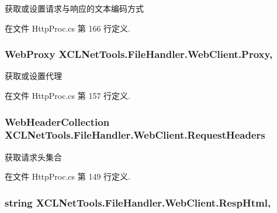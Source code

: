 获取或设置请求与响应的文本编码方式 



在文件 Http\-Proc.\-cs 第 166 行定义.

\hypertarget{class_x_c_l_net_tools_1_1_file_handler_1_1_web_client_ac2f17eefdc2372eb01a6be915d19c0ba}{
\subsubsection[{Proxy}]{\setlength{\rightskip}{0pt plus 5cm}Web\-Proxy X\-C\-L\-Net\-Tools.\-File\-Handler.\-Web\-Client.\-Proxy\hspace{0.3cm}{\ttfamily [get]}, {\ttfamily [set]}}}\label{class_x_c_l_net_tools_1_1_file_handler_1_1_web_client_ac2f17eefdc2372eb01a6be915d19c0ba}


获取或设置代理 



在文件 Http\-Proc.\-cs 第 157 行定义.

\hypertarget{class_x_c_l_net_tools_1_1_file_handler_1_1_web_client_a89d4bf2af70a2a0991904b1b61c8dd1d}{
\subsubsection[{Request\-Headers}]{\setlength{\rightskip}{0pt plus 5cm}Web\-Header\-Collection X\-C\-L\-Net\-Tools.\-File\-Handler.\-Web\-Client.\-Request\-Headers\hspace{0.3cm}{\ttfamily [get]}}}\label{class_x_c_l_net_tools_1_1_file_handler_1_1_web_client_a89d4bf2af70a2a0991904b1b61c8dd1d}


获取请求头集合 



在文件 Http\-Proc.\-cs 第 149 行定义.

\hypertarget{class_x_c_l_net_tools_1_1_file_handler_1_1_web_client_a67e90e96bd067171c16cb84d75f66c3a}{
\subsubsection[{Resp\-Html}]{\setlength{\rightskip}{0pt plus 5cm}string X\-C\-L\-Net\-Tools.\-File\-Handler.\-Web\-Client.\-Resp\-Html\hspace{0.3cm}{\ttfamily [get]}, {\ttfamily [set]}}}\label{class_x_c_l_net_tools_1_1_file_handler_1_1_web_client_a67e90e96bd067171c16cb84d75f66c3a}


